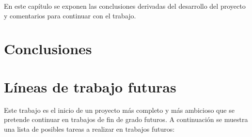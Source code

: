 
En este capítulo se exponen las conclusiones derivadas del desarrollo del proyecto y comentarios para continuar con el trabajo.

\section{Conclusiones}

\section{Líneas de trabajo futuras}

Este trabajo es el inicio de un proyecto más completo y más ambicioso que se pretende continuar en trabajos de fin de grado futuros. A continuación se muestra una lista de posibles tareas a realizar en trabajos futuros:

